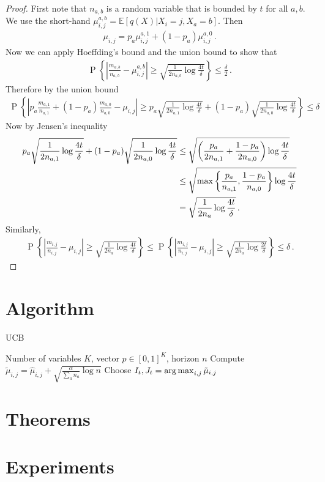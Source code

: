 \documentclass{article}
\newcommand{\E}{\mathbb E}
\newcommand{\set}[1]{\left\{#1\right\}}
\newcommand{\argmax}{\operatornamewithlimits{arg\,max}}
\newcommand{\eq}[1]{\begin{align*}#1\end{align*}}
\renewcommand{\P}[1]{\operatorname{P}\left\{#1\right\}}
\theoremstyle{plain}
\theoremstyle{definition}
\begin{document}
\begin{proof}
First note that $n_{a,b}$ is a random variable that is bounded by $t$ for all $a,b$.
We use the short-hand $\mu^{a,b}_{i,j} = \E[q(X) | X_i = j, X_a = b]$. Then
\eq{
\mu_{i,j} = p_a \mu_{i,j}^{a,1} + (1 - p_a) \mu_{i,j}^{a,0}\,.
}
Now we can apply Hoeffding's bound and the union bound to show that
\eq{
\P{\left|\frac{m_{a,b}}{n_{a,b}} - \mu_{i,j}^{a,b}\right| \geq \sqrt{\frac{1}{2n_{a,b}} \log \frac{4t}{\delta}}} \leq \frac{\delta}{2}\,.
}
Therefore by the union bound
\eq{
\P{\left|p_a \frac{m_{a,1}}{n_{a,1}} + (1 - p_a) \frac{m_{a,0}}{n_{a,0}} - \mu_{i,j}\right| \geq p_a \sqrt{\frac{1}{2n_{a,1}} \log\frac{4t}{\delta}}
+ (1 - p_a) \sqrt{\frac{1}{2n_{a,0}}\log\frac{4t}{\delta}}} \leq \delta\,
}
Now by Jensen's inequality 
\eq{
p_a \sqrt{\frac{1}{2n_{a,1}}\log\frac{4t}{\delta}} + (1 - p_a) \sqrt{\frac{1}{2n_{a,0}}\log\frac{4t}{\delta}}
&\leq \sqrt{\left(\frac{p_a}{2n_{a,1}} + \frac{1-p_a}{2n_{a,0}}\right)\log \frac{4t}{\delta}} \\
&\leq \sqrt{\max\set{\frac{p_a}{n_{a,1}}, \frac{1-p_a}{n_{a,0}}} \log\frac{4t}{\delta}} \\
&= \sqrt{{1 \over 2n_a} \log\frac{4t}{\delta}}\,.
}
Similarly,
\eq{
\P{\left|\frac{m_{i,j}}{n_{i,j}} - \mu_{i,j}\right| \geq \sqrt{\frac{1}{2n_a} \log\frac{4t}{\delta}}} \leq
\P{\left|\frac{m_{i,j}}{n_{i,j}} - \mu_{i,j}\right| \geq \sqrt{\frac{1}{2n_a} \log\frac{2t}{\delta}}} \leq \delta\,.
}
\end{proof}

\section{Algorithm}

\begin{algorithm}
\caption{UCB}
\begin{algorithmic}[1]
 Number of variables $K$, vector $p \in [0,1]^K$, horizon $n$
\For{$j \in \set{0,1}$}
\State Compute $\tilde \mu_{i,j} = \hat \mu_{i,j} + \sqrt{\frac{\alpha}{\sum_{a} n_a} \log n}$ 
\EndFor
\EndFor
\State Choose $I_t, J_t = \argmax_{i,j} \tilde \mu_{i,j}$
\EndFor
\end{algorithmic}
\end{algorithm}

\section{Theorems}
\section{Experiments}
\end{document}
